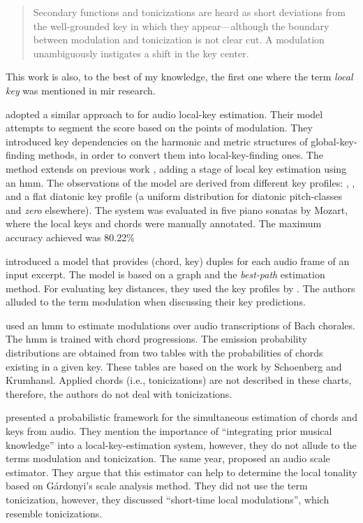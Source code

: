 \begin{quote}
    Secondary functions and tonicizations are heard as short
    deviations from the well-grounded key in which they
    appear---although the boundary between modulation and
    tonicization is not clear cut. A modulation
    unambiguously instigates a shift in the key center.
\end{quote}

This work is also, to the best of my knowledge, the first
one where the term \emph{local key} was mentioned in \gls{mir} research.

\textcite{papadopoulos2009local} adopted a similar approach
to \textcite{izmirli2007localized} for audio local-key
estimation. Their model attempts to segment the score based
on the points of modulation. They introduced key
dependencies on the harmonic and metric structures of
global-key-finding methods, in order to convert them into
local-key-finding ones. The method extends on previous work
\parencite{papadopoulos2008simultaneous}, adding a stage of
local key estimation using an \gls{hmm}. The observations of
the model are derived from different key profiles:
\textcite{krumhansl1982tracing},
\textcite{temperley1999whats}, and a flat diatonic key
profile (a uniform distribution for diatonic pitch-classes
and \emph{zero} elsewhere). The system was evaluated in five
piano sonatas by Mozart, where the local keys and chords
were manually annotated. The maximum accuracy achieved was
80.22\%


\textcite{rocher2010concurrent} introduced a model that
provides (chord, key) duples for each audio frame of an
input excerpt. The model is based on a graph and the
\emph{best-path} estimation method. For evaluating key
distances, they used the key profiles by
\textcite{temperley1999whats}. The authors alluded to the
term modulation when discussing their key predictions.

\textcite{mearns2011automatically} used an \gls{hmm} to
estimate modulations over audio transcriptions of Bach
chorales. The \gls{hmm} is trained with chord progressions.
The emission probability distributions are obtained from two
tables with the probabilities of chords existing in a given
key. These tables are based on the work by Schoenberg and
Krumhansl. Applied chords (i.e., tonicizations) are not
described in these charts, therefore, the authors do not
deal with tonicizations.

\textcite{pauwels2014combining} presented a probabilistic
framework for the simultaneous estimation of chords and keys
from audio. They mention the importance of ``integrating
prior musical knowledge'' into a local-key-estimation
system, however, they do not allude to the terms modulation
and tonicization. The same year,
\textcite{weis2014chromabased} proposed an audio scale
estimator. They argue that this estimator can help to
determine the local tonality based on G\'{a}rdonyi's scale
analysis method. They did not use the term tonicization,
however, they discussed ``short-time local modulations'',
which resemble tonicizations.

